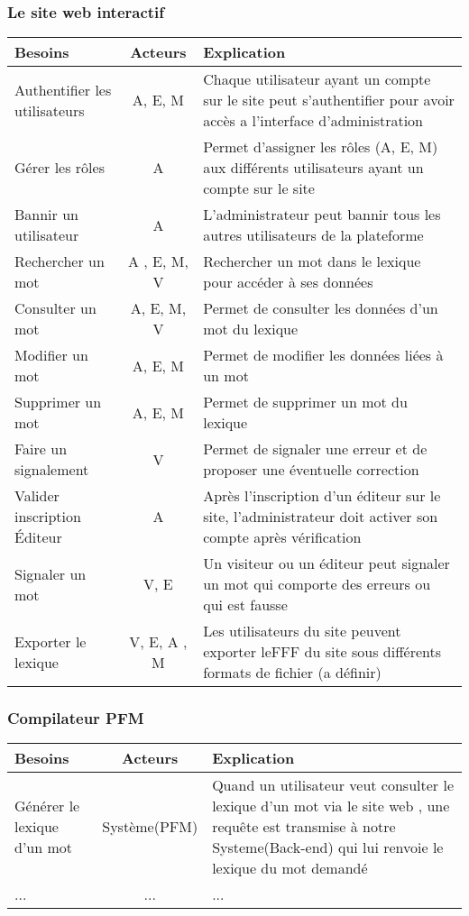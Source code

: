 \documentclass{article}
\begin{document}
\subsubsection{Le site web interactif}
\begin{tabularx}{\textwidth}{|l|c|X|}
  \hline
  \textbf{Besoins} & 
  \textbf{Acteurs} & 
  \textbf{Explication} \\
  \hline
  Authentifier les utilisateurs & 
  A, E, M & 
  Chaque utilisateur ayant un compte sur le site peut s'authentifier pour avoir accès a l'interface d'administration \\ 
  \hline
  Gérer les rôles & 
  A & 
  Permet d'assigner les rôles (A, E, M) aux différents utilisateurs ayant un compte sur le site \\
  \hline
  Bannir un utilisateur& 
  A & 
  L'administrateur peut bannir tous les autres utilisateurs de la plateforme \\
  \hline
  Rechercher un mot & 
  A , E, M, V & 
  Rechercher un mot dans le lexique pour accéder à ses données \\
  \hline
  Consulter un mot &
  A, E, M, V &
  Permet de consulter les données d'un mot du lexique \\
  \hline
  Modifier un mot &
  A, E, M & 
  Permet de modifier les données liées à un mot \\
  \hline
  Supprimer un mot &
  A, E, M & 
  Permet de supprimer un mot du lexique \\
  \hline
  Faire un signalement & 
  V &
  Permet de signaler une erreur et de proposer une éventuelle correction \\
  \hline
  Valider inscription Éditeur &
  A &
  Après l'inscription d'un éditeur sur le site, l'administrateur doit activer son compte après vérification \\
  \hline
  Signaler un mot &
  V, E &
  Un visiteur ou un éditeur peut signaler un mot qui comporte des erreurs ou qui est fausse \\
  \hline
  Exporter le lexique &
  V, E, A , M &
  Les utilisateurs du site peuvent exporter leFFF du site sous différents formats de fichier (a définir)\\
  \hline
\end{tabularx}

\subsubsection{Compilateur PFM}
\begin{tabularx}{\textwidth}{|l|c|X|}
  \hline
  Besoins & Acteurs & Explication \\
  \hline
  Générer le lexique d'un mot &
  Système(PFM)
  & Quand un utilisateur veut consulter le lexique d'un mot via le site web , une requête est transmise à notre Systeme(Back-end) qui lui renvoie le lexique du mot demandé \\
  \hline
  ...
  & ... 
  & ... \\

  \hline
\end{tabularx}
\end{document}
